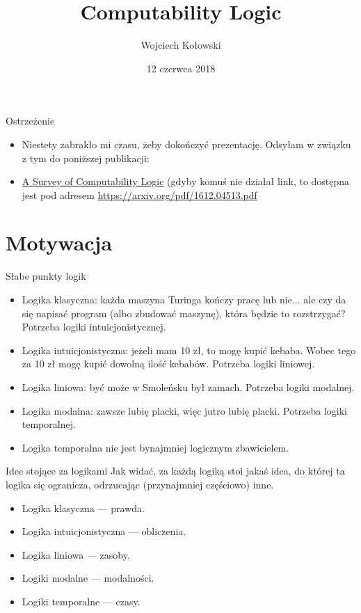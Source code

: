 \documentclass{beamer}
\title{Computability Logic}
\author{Wojciech Kołowski}
\date{12 czerwca 2018}
\begin{document}
\frame{\titlepage}

\frame{\tableofcontents}

\begin{frame}{Ostrzeżenie}
\begin{itemize}
	\item Niestety zabrakło mi czasu, żeby dokończyć prezentację. Odsyłam w związku z tym do poniższej publikacji:
	\item \href{https://arxiv.org/pdf/1612.04513.pdf}{A Survey of Computability Logic} (gdyby komuś nie działał link, to dostępna jest pod adresem \url{https://arxiv.org/pdf/1612.04513.pdf}
\end{itemize}
\end{frame}

\section{Motywacja}

\begin{frame}{Słabe punkty logik}
\begin{itemize}
	\item Logika klasyczna: każda maszyna Turinga kończy pracę lub nie... ale czy da się napisać program (albo zbudować maszynę), która będzie to rozstrzygać? Potrzeba logiki intuicjonistycznej.
	\item Logika intuicjonistyczna: jeżeli mam 10 zł, to mogę kupić kebaba. Wobec tego za 10 zł mogę kupić dowolną ilość kebabów. Potrzeba logiki liniowej.
	\item Logika liniowa: być może w Smoleńsku był zamach. Potrzeba logiki modalnej.
	\item Logika modalna: zawsze lubię placki, więc jutro lubię placki. Potrzeba logiki temporalnej.
	\item Logika temporalna nie jest bynajmniej logicznym zbawicielem.
\end{itemize}
\end{frame}

\begin{frame}{Idee stojące za logikami}
	Jak widać, za każdą logiką stoi jakaś idea, do której ta logika się ogranicza, odrzucając (przynajmniej częściowo) inne.
	\begin{itemize}
		\item Logika klasyczna — prawda.
		\item Logika intuicjonistyczna — obliczenia.
		\item Logika liniowa — zasoby.
		\item Logiki modalne — modalności.
		\item Logiki temporalne — czasy.
	\end{itemize}
\end{frame}
\end{document}
